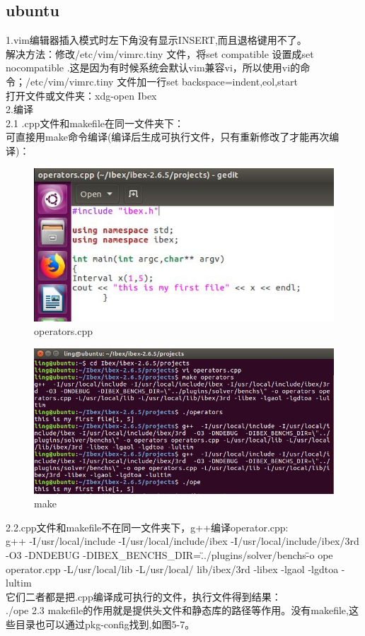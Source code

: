 \documentclass[UTF8]{ctexart}
\begin{document}
\subsection{ubuntu}
1.vim编辑器插入模式时左下角没有显示INSERT,而且退格键用不了。\\
解决方法：修改/etc/vim/vimrc.tiny 文件，将set compatible 设置成set nocompatible .这是因为有时候系统会默认vim兼容vi，所以使用vi的命令；/etc/vim/vimrc.tiny 文件加一行set backspace=indent,eol,start \\
打开文件或文件夹：xdg-open Ibex\\
2.编译\\
2.1 .cpp文件和makefile在同一文件夹下：\\
可直接用make命令编译(编译后生成可执行文件，只有重新修改了才能再次编译)：\\
\begin{figure}
  \includegraphics[width=.8\linewidth]{chengxu1.JPG}
  \caption{operators.cpp}
  \label{fig:boat1}
\end{figure}

\begin{figure}
  \includegraphics[width=.8\linewidth]{make1.JPG}
  \caption{make}
  \label{fig:boat1}
\end{figure}
2.2.cpp文件和makefile不在同一文件夹下，g++编译operator.cpp:\\
g++  -I/usr/local/include -I/usr/local/include/ibex -I/usr/local/include/ibex/3rd  -O3 -DNDEBUG  -DIBEX_BENCHS_DIR=\"../plugins/solver/benchs\" -o ope operator.cpp -L/usr/local/lib -L/usr/local/
lib/ibex/3rd -libex -lgaol -lgdtoa -lultim\\
它们二者都是把.cpp编译成可执行的文件，执行文件得到结果：\\
./ope
2.3 makefile的作用就是提供头文件和静态库的路径等作用。没有makefile,这些目录也可以通过pkg-config找到,如图5-7。
\end{document}
